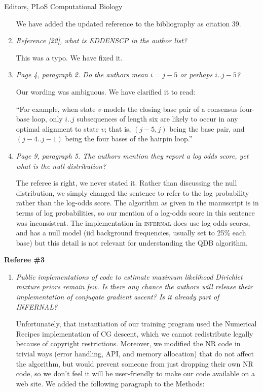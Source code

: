 \documentclass{jfrcletter}
\begin{document}
\begin{letter}{Editors, PLoS Computational Biology}
\begin{enumerate}
   We have added the updated reference to the bibliography as citation
   39.

\item \emph{\footnotesize Reference [22], what is EDDENSCP in the author list?}

   This was a typo. We have fixed it.


\item \emph{\footnotesize Page 4, paragraph 2. Do the authors mean $i=j-5$ or perhaps $i
   .. j-5$?}
   
   Our wording was ambiguous.  We have clarified it to read:

   ``For example, when state $v$ models the closing base pair of a
   consensus four-base loop, only $i..j$ subsequences of length six
   are likely to occur in any optimal alignment to state $v$; that is,
   $(j-5,j)$ being the base pair, and $(j-4..j-1)$ being the four
   bases of the hairpin loop.''


\item \emph{\footnotesize Page 9, paragraph 5. The authors mention they report a log
    odds score, yet what is the null distribution?}

    The referee is right, we never stated it. Rather than discussing
    the null distribution, we simply changed the sentence to refer to
    the log probability rather than the log-odds score.  The algorithm
    as given in the manuscript is in terms of log probabilities, so
    our mention of a log-odds score in this sentence was
    inconsistent. The implementation in \textsc{infernal} does use log
    odds scores, and has a null model (iid background frequencies,
    usually set to 25\% each base) but this detail is not relevant for
    understanding the QDB algorithm.
\end{enumerate}



\textbf{Referee \#3}
\begin{enumerate}

\item \emph{\footnotesize Public implementations of code to estimate maximum
    likelihood Dirichlet mixture priors remain few. Is there any
    chance the authors will release their implementation of conjugate
    gradient ascent? Is it already part of INFERNAL?}

   Unfortunately, that instantiation of our training program used the
   Numerical Recipes implementation of CG descent, which we cannot
   redistribute legally because of copyright restrictions. Moreover,
   we modified the NR code in trivial ways (error handling, API, and
   memory allocation) that do not affect the algorithm, but would
   prevent someone from just dropping their own NR code, so we don't
   feel it will be user-friendly to make our code available on a web
   site. We added the following paragraph to the Methods:


\end{enumerate}
\end{letter}
\end{document}
